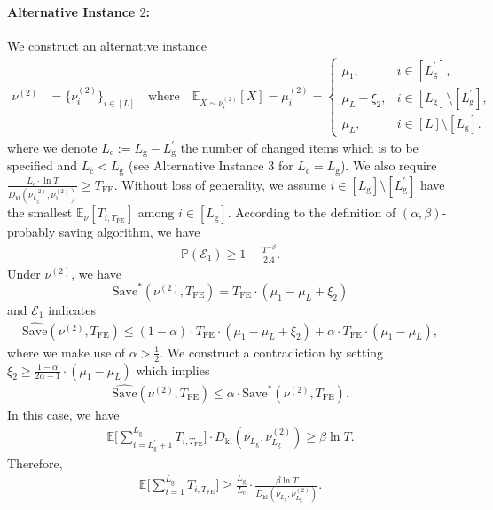 \documentclass[twoside,11pt]{article}
\newcommand{\kl}{D_{\mathrm{kl}}}
\newcommand{\calE}{\mathcal{E}}
\newcommand{\rmc}{\mathrm{c}}
\newcommand{\rmg}{\mathrm{g}}
\newcommand{\bbE}{\mathbb{E}}
\newcommand{\bbP}{\mathbb{P}}
\newcommand{\Tfe}{T_{\mathrm{FE}}}
\newcommand{\Saved}{\mathrm{Save}}
\begin{document}
\paragraph{Alternative Instance $2$:}
We construct an alternative instance
\begin{align}
\nu^{(2)} 
&= \bigl\{ \nu_i^{(2)} \bigr\}_{i\in[L]}
\quad\text{where}\quad
\bbE_{X\sim\nu_i^{(2)}}[X]=
\mu_i^{(2)} =
\begin{cases}
\mu_1, & i \in[L_{\rmg}^\prime], \\
\mu_L-\xi_2, & i \in [L_{\rmg}]\setminus[L_{\rmg}^\prime], \\
\mu_L, & i \in [L]\setminus[L_{\rmg}].
\end{cases}
\end{align}
where we denote $L_{\rmc} := L_{\rmg}-L_{\rmg}^\prime$ the number of changed items which is to be specified and $L_{\rmc}< L_{\rmg}$ (see Alternative Instance $3$ for $L_{\rmc}=L_{\rmg}$). 
We also require $ \frac{L_{\rmc}\cdot\ln T}{\kl(\nu_{L_{\rmg}}^{(2)},\nu_{1}^{(2)})} \geq \Tfe$.
Without loss of generality, we assume $i \in [L_{\rmg}]\setminus[L_{\rmg}^\prime]$ have the smallest $\bbE_{\nu}[T_{i,\Tfe}]$ among $i\in[L_{\rmg}].$
According to the definition of $(\alpha, \beta)$-probably saving algorithm, we have
\begin{align}
    \bbP(\calE_1)\geq 1- \frac{T^{-\beta}}{2.4}.
\end{align}
Under $\nu^{(2)}$, we have
$$ \Saved^*(\nu^{(2)},\Tfe) = \Tfe\cdot(\mu_1-\mu_L+\xi_2) $$
and $\calE_1$ indicates
\begin{align}
    \widehat{\Saved}(\nu^{(2)},\Tfe)\leq  (1-\alpha)\cdot \Tfe \cdot (\mu_1-\mu_L+\xi_2) + \alpha\cdot \Tfe\cdot (\mu_1-\mu_L),
\end{align}
where we make use of $\alpha> \frac{1}{2}$. 
We construct a contradiction by setting $\xi_2\geq \frac{1-\alpha}{2\alpha-1}\cdot(\mu_1-\mu_L)$ which implies
\begin{align}
    \widehat{\Saved}(\nu^{(2)},\Tfe)\leq \alpha\cdot \Saved^*(\nu^{(2)},\Tfe).
\end{align}
In this case, 
we have 
\begin{align}
    \bbE\bigg[\sum_{i=L_{\rmg}^\prime+1}^{L_{\rmg}} T_{i,\Tfe} \bigg] \cdot 
    \kl(\nu_{L_{\rmg}},\nu_{L_{\rmg}}^{(2)})
    \geq \beta \ln T.
\end{align}
Therefore,
\begin{align}
    \bbE\bigg[\sum_{i=1}^{L_{\rmg}} T_{i,\Tfe} \bigg]
    \geq 
    \frac{L_{\rmg}}{L_{\rmc}} \cdot \frac{\beta\ln T}{\kl(\nu_{L_{\rmg}},\nu_{L_{\rmg}}^{(2)})}.
\end{align}
\end{document}
